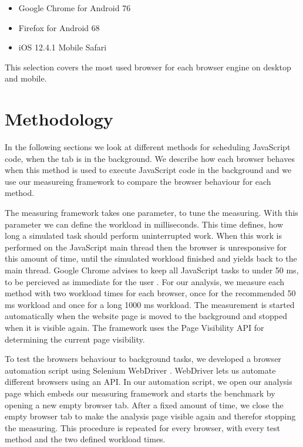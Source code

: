 \documentclass[
	ruledheaders=section,%
	class=report,%
	thesis={type=bachelor},%
	accentcolor=9c,%
	custommargins=true,%
	marginpar=false,%
	parskip=half-,%
	fontsize=11pt,%
]{tudapub}
\begin{document}
  \begin{itemize}
  \item Google Chrome for Android 76
  \item Firefox for Android 68
  \item iOS 12.4.1 Mobile Safari
  \end{itemize}

  This selection covers the most used browser for each browser engine on desktop and mobile. 

  \section{Methodology}

  In the following sections we look at different methods for scheduling JavaScript code, when the tab is in the background. We describe how each browser behaves when this method is used to execute JavaScript code in the background and we use our measureing framework to compare the browser behaviour for each method.

  The measuring framework takes one parameter, to tune the measuring. With this parameter we can define the workload in milliseconds. This time defines, how long a simulated task should perform uninterrupted work. When this work is performed on the JavaScript main thread then the browser is unresponsive for this amount of time, until the simulated workload finished and yields back to the main thread. Google Chrome advises to keep all JavaScript tasks to under 50 ms, to be percieved as immediate for the user \cite{chrome-rail-model}. For our analysis, we measure each method with two workload times for each browser, once for the recommended 50 ms workload and once for a long 1000 ms workload. The measurement is started automatically when the website page is moved to the background and stopped when it is visible again. The framework uses the Page Visibility API \cite{mdn-page-visibility} for determining the current page visibility.

  To test the browsers behaviour to background tasks, we developed a browser automation script using Selenium WebDriver \cite{webdriver}. WebDriver lets us automate different browsers using an API. In our automation script, we open our analysis page which embeds our measuring framework and starts the benchmark by opening a new empty browser tab. After a fixed amount of time, we close the empty browser tab to make the analysis page visible again and therefor stopping the measuring. This procedure is repeated for every browser, with every test method and the two defined workload times.
\end{document}
